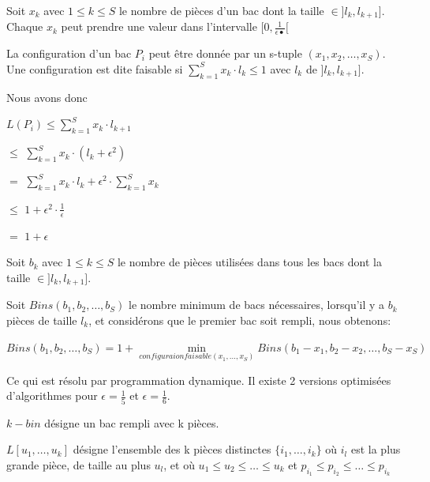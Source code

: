 \documentclass[a4paper,12pt]{report}
\theoremstyle{plain}				%
\theoremstyle{definition}				%
\begin{document}
Soit $x_k$ avec $1 \le k \le S$ le nombre de pièces d'un bac dont la
taille $\in ]l_k, l_{k+1}]$.
Chaque $x_k$ peut prendre une valeur dans l'intervalle
$[0,\frac{1}{\epsilon•}[$

La configuration d'un bac $P_i$ peut être donnée par un s-tuple $(x_1, x_2, \ldots, x_S)$.
Une configuration est dite faisable si $\sum_{k=1}^{S}x_k \cdot l_k
\le 1$ avec $l_k$ de $]l_k, l_{k+1}]$.

Nous avons donc

$L(P_i) \le \sum_{k=1}^{S}x_k \cdot l_{k+1}$

$\le$
$\sum_{k=1}^{S}x_k \cdot (l_k+\epsilon^2)$

$=$
$\sum_{k=1}^{S}x_k \cdot l_k  +  \epsilon^2 \cdot \sum_{k=1}^{S}x_k$

$\le$
$1 + \epsilon^2 \cdot \frac{1}{\epsilon}$

$=$
$1 + \epsilon$

\bigskip
Soit $b_k$ avec $1 \le k \le S$ le nombre de pièces utilisées dans
tous les bacs dont la taille $\in ]l_k, l_{k+1}]$.

Soit $Bins(b_1, b_2, \ldots, b_S)$ le nombre minimum de bacs
nécessaires, lorsqu'il y a $b_k$ pièces de taille $l_k$, et
considérons que le premier bac soit rempli, nous obtenons:

$Bins(b_1, b_2, \ldots, b_S) = 1 + \underset{configuraion faisable
  (x_1, \ldots, x_S)}{\min} Bins(b_1-x_1, b_2-x_2, \ldots, b_S-x_S)$

Ce qui est résolu par programmation dynamique.
Il existe 2 versions optimisées d'algorithmes pour
$\epsilon = \frac{1}{5}$ et
$\epsilon = \frac{1}{6}$.

\bigskip

$k-bin$ désigne un bac rempli avec k pièces.

$L[u_1, \ldots, u_k]$ désigne l'ensemble des
k pièces distinctes $\{i_1, \ldots, i_k\}$
où $i_l$ est la plus grande pièce, de taille au plus $u_l$,
et où $u_1 \leq u_2 \leq \ldots \leq u_k$ et
$p_{i_1} \leq p_{i_2} \leq \ldots \leq p_{i_k}$
\end{document}
